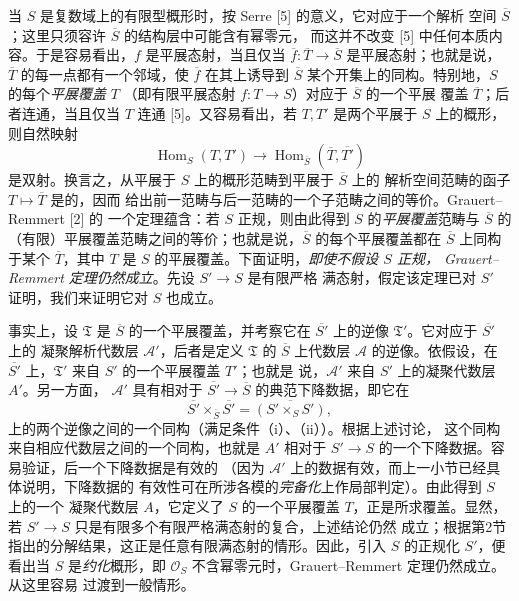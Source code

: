 当 $S$ 是复数域上的有限型概形时，按 Serre [5] 的意义，它对应于一个解析
空间 $\overline S$；这里只须容许 $\overline S$ 的结构层中可能含有幂零元，
而这并不改变 [5] 中任何本质内容。于是容易看出，$f$ 是平展态射，当且仅当
$\overline f:\overline T\longrightarrow\overline S$ 是平展态射；也就是说，
$\overline T$ 的每一点都有一个邻域，使 $\overline f$ 在其上诱导到
$\overline S$ 某个开集上的同构。特别地，$S$ 的每个\emph{平展覆盖} $T$
（即有限平展态射 $f:T\longrightarrow S$）对应于 $\overline S$ 的一个平展
覆盖 $\overline T$；后者连通，当且仅当 $T$ 连通 [5]。又容易看出，若
$T,T'$ 是两个平展于 $S$ 上的概形，则自然映射
\[
  \operatorname{Hom}_S(T,T')\longrightarrow
  \operatorname{Hom}_{\overline S}(\overline T,\overline{T'})
\]
是双射。换言之，从平展于 $S$ 上的概形范畴到平展于 $\overline S$ 上的
解析空间范畴的函子 $T\longmapsto\overline T$ 是的，因而
给出前一范畴与后一范畴的一个子范畴之间的等价。Grauert--Remmert [2] 的
一个定理蕴含：若 $S$ 正规，则由此得到 $S$ 的\emph{平展覆盖}范畴与
$\overline S$ 的（有限）平展覆盖范畴之间的等价；也就是说，$\overline S$
的每个平展覆盖都在 $\overline S$ 上同构于某个 $\overline T$，其中 $T$
是 $S$ 的平展覆盖。下面证明，\emph{即使不假设 $S$ 正规，
Grauert--Remmert 定理仍然成立}。先设 $S'\longrightarrow S$ 是有限严格
满态射，假定该定理已对 $S'$ 证明，我们来证明它对 $S$ 也成立。

事实上，设 $\mathfrak T$ 是 $\overline S$ 的一个平展覆盖，并考察它在
$\overline{S'}$ 上的逆像 $\mathfrak T'$。它对应于 $\overline{S'}$ 上的
凝聚解析代数层 $\mathcal A'$，后者是定义 $\mathfrak T$ 的
$\overline S$ 上代数层 $\mathcal A$ 的逆像。依假设，在
$\overline{S'}$ 上，$\mathfrak T'$ 来自 $S'$ 的一个平展覆盖 $T'$；也就是
说，$\mathcal A'$ 来自 $S'$ 上的凝聚代数层 $A'$。另一方面，
$\mathcal A'$ 具有相对于
$\overline{S'}\longrightarrow\overline S$ 的典范下降数据，即它在
\[
  \overline{S'}\times_{\overline S}\overline{S'}
  =\overline{(S'\times_SS')},
\]
上的两个逆像之间的一个同构（满足条件（i）、（ii））。根据上述讨论，
这个同构来自相应代数层之间的一个同构，也就是 $A'$ 相对于
$S'\longrightarrow S$ 的一个下降数据。容易验证，后一个下降数据是有效的
（因为 $\mathcal A'$ 上的数据有效，而上一小节已经具体说明，下降数据的
有效性可在所涉各模的\emph{完备化}上作局部判定）。由此得到 $S$ 上的一个
凝聚代数层 $A$，它定义了 $S$ 的一个平展覆盖 $T$，正是所求覆盖。显然，若
$S'\longrightarrow S$ 只是有限多个有限严格满态射的复合，上述结论仍然
成立；根据第2节指出的分解结果，这正是任意有限满态射的情形。因此，引入
$S$ 的正规化 $S'$，便看出当 $S$ 是\emph{约化}概形，即
$\mathcal O_S$ 不含幂零元时，Grauert--Remmert 定理仍然成立。从这里容易
过渡到一般情形。

